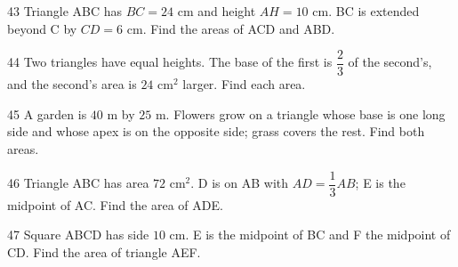 \gap
\begin{probbox}{43}{}
Triangle ABC has $BC=24$ cm and height $AH=10$ cm. BC is extended beyond C by $CD=6$ cm. Find the areas of ACD and ABD.
\end{probbox}
\gap
\begin{probbox}{44}{}
Two triangles have equal heights. The base of the first is $\dfrac23$ of the second's, and the second's area is $24$ cm$^2$ larger. Find each area.
\end{probbox}
\gap
\begin{probbox}{45}{}
A garden is $40$ m by $25$ m. Flowers grow on a triangle whose base is one long side and whose apex is on the opposite side; grass covers the rest. Find both areas.
\end{probbox}
\gap
\begin{probbox}{46}{}
Triangle ABC has area $72$ cm$^2$. D is on AB with $AD=\dfrac13AB$; E is the midpoint of AC. Find the area of ADE.
\end{probbox}
\gap
\begin{probbox}{47}{}
Square ABCD has side $10$ cm. E is the midpoint of BC and F the midpoint of CD. Find the area of triangle AEF.
\end{probbox}
